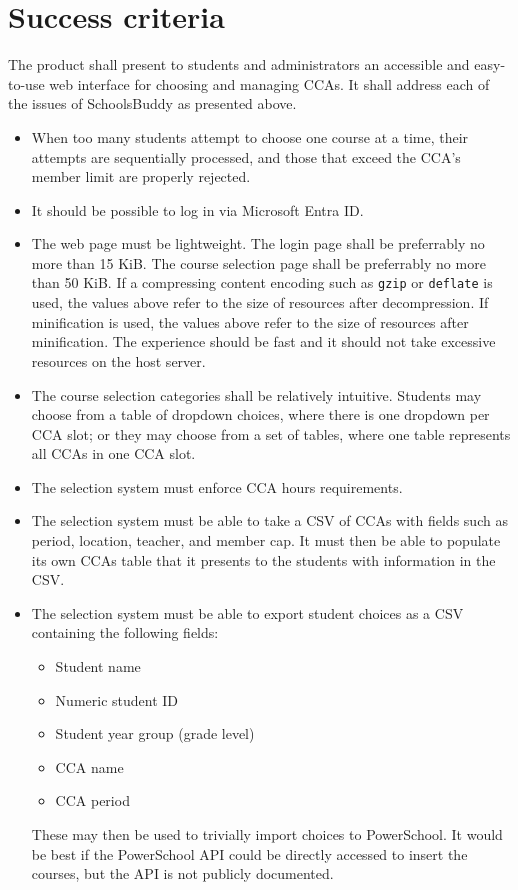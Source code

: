 \section{Success criteria}

The product shall present to students and administrators an accessible and
easy-to-use web interface for choosing and managing CCAs. It shall address each
of the issues of SchoolsBuddy as presented above.

\begin{itemize}
	\item When too many students attempt to choose one course at a time,
		their attempts are sequentially processed, and those that
		exceed the CCA's member limit are properly rejected.
	\item It should be possible to log in via Microsoft Entra ID.
	\item The web page must be lightweight. The login page shall be
		preferrably no more than 15 KiB. The course selection page
		shall be preferrably no more than 50 KiB.
		If a compressing content encoding such as \texttt{gzip} or
		\texttt{deflate} is used, the values above refer to the size of
		resources after decompression. If minification is used, the
		values above refer to the size of resources after minification.
		The experience should be fast and it should not take excessive
		resources on the host server.
	\item The course selection categories shall be relatively intuitive.
		Students may choose from a table of dropdown choices, where
		there is one dropdown per CCA slot; or they may choose from a
		set of tables, where one table represents all CCAs in one
		CCA slot.
	\item The selection system must enforce CCA hours requirements.
	\item The selection system must be able to take a CSV of CCAs with
		fields such as period, location, teacher, and member cap. It
		must then be able to populate its own CCAs table that it
		presents to the students with information in the CSV.
	\item The selection system must be able to export student choices as a
		CSV containing the following fields:
		\begin{itemize}
			\item Student name
			\item Numeric student ID
			\item Student year group (grade level)
			\item CCA name
			\item CCA period
		\end{itemize}
		These may then be used to trivially import choices to
		PowerSchool. It would be best if the PowerSchool API could be
		directly accessed to insert the courses, but the API is not
		publicly documented.
\end{itemize}


